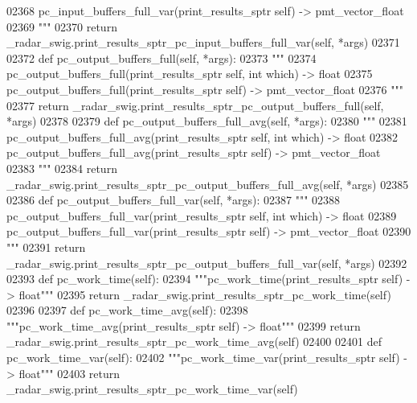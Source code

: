 \begin{DoxyCode}
{{{{{{{{{02368 \textcolor{stringliteral}{        pc\_input\_buffers\_full\_var(print\_results\_sptr self) -> pmt\_vector\_float}
02369 \textcolor{stringliteral}{        """}
02370         \textcolor{keywordflow}{return} \_radar\_swig.print\_results\_sptr\_pc\_input\_buffers\_full\_var(self, *args)
02371 
02372     \textcolor{keyword}{def }pc_output_buffers_full(self, *args):
02373         \textcolor{stringliteral}{"""}
02374 \textcolor{stringliteral}{        pc\_output\_buffers\_full(print\_results\_sptr self, int which) -> float}
02375 \textcolor{stringliteral}{        pc\_output\_buffers\_full(print\_results\_sptr self) -> pmt\_vector\_float}
02376 \textcolor{stringliteral}{        """}
02377         \textcolor{keywordflow}{return} \_radar\_swig.print\_results\_sptr\_pc\_output\_buffers\_full(self, *args)
02378 
02379     \textcolor{keyword}{def }pc_output_buffers_full_avg(self, *args):
02380         \textcolor{stringliteral}{"""}
02381 \textcolor{stringliteral}{        pc\_output\_buffers\_full\_avg(print\_results\_sptr self, int which) -> float}
02382 \textcolor{stringliteral}{        pc\_output\_buffers\_full\_avg(print\_results\_sptr self) -> pmt\_vector\_float}
02383 \textcolor{stringliteral}{        """}
02384         \textcolor{keywordflow}{return} \_radar\_swig.print\_results\_sptr\_pc\_output\_buffers\_full\_avg(self, *args)
02385 
02386     \textcolor{keyword}{def }pc_output_buffers_full_var(self, *args):
02387         \textcolor{stringliteral}{"""}
02388 \textcolor{stringliteral}{        pc\_output\_buffers\_full\_var(print\_results\_sptr self, int which) -> float}
02389 \textcolor{stringliteral}{        pc\_output\_buffers\_full\_var(print\_results\_sptr self) -> pmt\_vector\_float}
02390 \textcolor{stringliteral}{        """}
02391         \textcolor{keywordflow}{return} \_radar\_swig.print\_results\_sptr\_pc\_output\_buffers\_full\_var(self, *args)
02392 
02393     \textcolor{keyword}{def }pc_work_time(self):
02394         \textcolor{stringliteral}{"""pc\_work\_time(print\_results\_sptr self) -> float"""}
02395         \textcolor{keywordflow}{return} \_radar\_swig.print\_results\_sptr\_pc\_work\_time(self)
02396 
02397     \textcolor{keyword}{def }pc_work_time_avg(self):
02398         \textcolor{stringliteral}{"""pc\_work\_time\_avg(print\_results\_sptr self) -> float"""}
02399         \textcolor{keywordflow}{return} \_radar\_swig.print\_results\_sptr\_pc\_work\_time\_avg(self)
02400 
02401     \textcolor{keyword}{def }pc_work_time_var(self):
02402         \textcolor{stringliteral}{"""pc\_work\_time\_var(print\_results\_sptr self) -> float"""}
02403         \textcolor{keywordflow}{return} \_radar\_swig.print\_results\_sptr\_pc\_work\_time\_var(self)
}}}}}}}}}
\end{DoxyCode}
